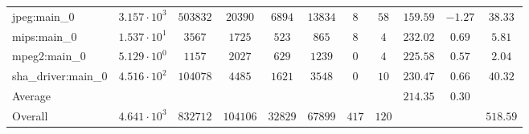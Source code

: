 \begin{tabular}{|l|c|c|c|c|c|c|c|c|c|c|}
jpeg:main\_0            & $ 3.157 \cdot 10^{3}  $ & $ 503832 $ & $ 20390  $ & $ 6894  $ & $ 13834 $ & $ 8   $ & $ 58  $ & $ 159.59      $ & $ -1.27   $ & $ 38.33   $ \\
mips:main\_0            & $ 1.537 \cdot 10^{1}  $ & $ 3567   $ & $ 1725   $ & $ 523   $ & $ 865   $ & $ 8   $ & $ 4   $ & $ 232.02      $ & $ 0.69    $ & $ 5.81    $ \\
mpeg2:main\_0           & $ 5.129 \cdot 10^{0}  $ & $ 1157   $ & $ 2027   $ & $ 629   $ & $ 1239  $ & $ 0   $ & $ 4   $ & $ 225.58      $ & $ 0.57    $ & $ 2.04    $ \\
sha\_driver:main\_0     & $ 4.516 \cdot 10^{2}  $ & $ 104078 $ & $ 4485   $ & $ 1621  $ & $ 3548  $ & $ 0   $ & $ 10  $ & $ 230.47      $ & $ 0.66    $ & $ 40.32   $ \\
\hline
Average                 & $                     $ & $        $ & $        $ & $       $ & $       $ & $     $ & $     $ & $ 214.35      $ & $ 0.30    $ & $         $ \\
\hline
Overall                 & $ 4.641 \cdot 10^{3}  $ & $ 832712 $ & $ 104106 $ & $ 32829 $ & $ 67899 $ & $ 417 $ & $ 120 $ & $             $ & $         $ & $ 518.59  $ \\
\hline
\end{tabular}
